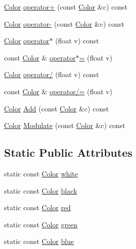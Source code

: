 \begin{DoxyCompactItemize}
\hyperlink{class_agmd_utilities_1_1_color}{Color} \hyperlink{class_agmd_utilities_1_1_color_a821125e127371847e9c490d31fa1426a}{operator+} (const \hyperlink{class_agmd_utilities_1_1_color}{Color} \&c) const 
\item 
\hyperlink{class_agmd_utilities_1_1_color}{Color} \hyperlink{class_agmd_utilities_1_1_color_a62621e41929e429a5309a0949813114b}{operator-\/} (const \hyperlink{class_agmd_utilities_1_1_color}{Color} \&c) const 
\item 
\hyperlink{class_agmd_utilities_1_1_color}{Color} \hyperlink{class_agmd_utilities_1_1_color_a757119695bc8701cac95d35cb41bd9cb}{operator$\ast$} (float v) const 
\item 
const \hyperlink{class_agmd_utilities_1_1_color}{Color} \& \hyperlink{class_agmd_utilities_1_1_color_ae119c2510c25383bcf5afc25624b4ced}{operator$\ast$=} (float v)
\item 
\hyperlink{class_agmd_utilities_1_1_color}{Color} \hyperlink{class_agmd_utilities_1_1_color_ae226f65082357c68eecabe7f08a9949d}{operator/} (float v) const 
\item 
const \hyperlink{class_agmd_utilities_1_1_color}{Color} \& \hyperlink{class_agmd_utilities_1_1_color_a87aacf8af495f497b072ff454394e65e}{operator/=} (float v)
\item 
\hyperlink{class_agmd_utilities_1_1_color}{Color} \hyperlink{class_agmd_utilities_1_1_color_a9a96d1fca2ba3adee8bdd5ee8a0007bc}{Add} (const \hyperlink{class_agmd_utilities_1_1_color}{Color} \&c) const 
\item 
\hyperlink{class_agmd_utilities_1_1_color}{Color} \hyperlink{class_agmd_utilities_1_1_color_a4bc4ec5cc78d5700c20f31a87297b2fb}{Modulate} (const \hyperlink{class_agmd_utilities_1_1_color}{Color} \&c) const 
\end{DoxyCompactItemize}
\subsection*{Static Public Attributes}
\begin{DoxyCompactItemize}
\item 
static const \hyperlink{class_agmd_utilities_1_1_color}{Color} \hyperlink{class_agmd_utilities_1_1_color_a0767e43641e0fedc97189dac0f92a0bc}{white}
\item 
static const \hyperlink{class_agmd_utilities_1_1_color}{Color} \hyperlink{class_agmd_utilities_1_1_color_a8d77852434eecc09d00501616e8b227c}{black}
\item 
static const \hyperlink{class_agmd_utilities_1_1_color}{Color} \hyperlink{class_agmd_utilities_1_1_color_a655ac415b3c9eb868da4622a0fea03f4}{red}
\item 
static const \hyperlink{class_agmd_utilities_1_1_color}{Color} \hyperlink{class_agmd_utilities_1_1_color_a9e32af0a003b8fce5dd68e5ce2d36026}{green}
\item 
static const \hyperlink{class_agmd_utilities_1_1_color}{Color} \hyperlink{class_agmd_utilities_1_1_color_ad158e415eff25c8413fd07db658bc360}{blue}
\end{DoxyCompactItemize}
